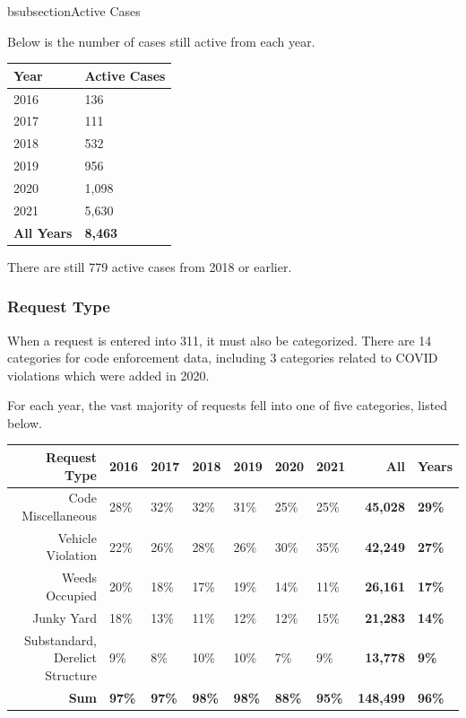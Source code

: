 \documentclass[
]{book}
\begin{document}
{bsubsection{Active Cases}\label{active-cases}}

Below is the number of cases still active from each year.

\begin{longtable}[]{@{}ll@{}}
\toprule
Year & Active Cases \\
\midrule
\endhead
2016 & 136 \\
2017 & 111 \\
2018 & 532 \\
2019 & 956 \\
2020 & 1,098 \\
2021 & 5,630 \\
\textbf{All Years} & \textbf{8,463} \\
\bottomrule
\end{longtable}

There are still 779 active cases from 2018 or earlier.

\hypertarget{request-type}{%
\subsubsection{Request Type}\label{request-type}}

When a request is entered into 311, it must also be categorized. There are 14 categories for code enforcement data, including 3 categories related to COVID violations which were added in 2020.

For each year, the vast majority of requests fell into one of five categories, listed below.

\begin{longtable}[]{@{}rllllllrl@{}}
\toprule
Request Type & 2016 & 2017 & 2018 & 2019 & 2020 & 2021 & All & Years \\
\midrule
\endhead
Code Miscellaneous & 28\% & 32\% & 32\% & 31\% & 25\% & 25\% & \textbf{45,028} & \textbf{29\%} \\
Vehicle Violation & 22\% & 26\% & 28\% & 26\% & 30\% & 35\% & \textbf{42,249} & \textbf{27\%} \\
Weeds Occupied & 20\% & 18\% & 17\% & 19\% & 14\% & 11\% & \textbf{26,161} & \textbf{17\%} \\
Junky Yard & 18\% & 13\% & 11\% & 12\% & 12\% & 15\% & \textbf{21,283} & \textbf{14\%} \\
Substandard, Derelict Structure & 9\% & 8\% & 10\% & 10\% & 7\% & 9\% & \textbf{13,778} & \textbf{9\%} \\
\textbf{Sum} & \textbf{97\%} & \textbf{97\%} & \textbf{98\%} & \textbf{98\%} & \textbf{88\%} & \textbf{95\%} & \textbf{148,499} & \textbf{96\%} \\
\bottomrule
\end{longtable}
\end{document}
